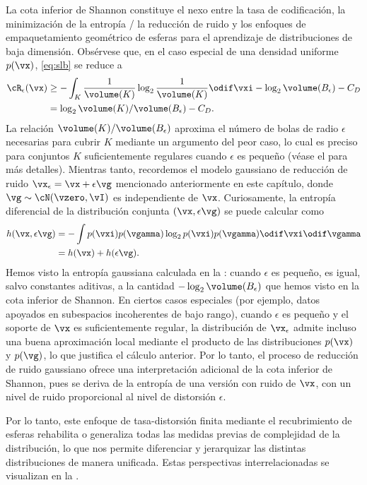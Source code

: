 \documentclass[../../book-main.tex]{subfiles}
\begin{document}
\begin{remark}
    La cota inferior de Shannon constituye el nexo entre la tasa de codificación, la minimización de la entropía /
    la reducción de ruido y los enfoques de empaquetamiento geométrico de esferas para el aprendizaje
    de distribuciones de baja dimensión. Obsérvese que, en el caso especial de una densidad uniforme
    $p(\vx)$, \eqref{eq:slb} se reduce a
    \begin{align}
        \cR_{\epsilon}(\vx) &\geq -\int_K \frac{1}{\volume(K)} \log_2
        \frac{1}{\volume(K)} \odif \vxi
        - \log_2 \volume(B_{\epsilon}) - C_D
        \\
        &=
        \log_2 \volume(K) / \volume(B_{\epsilon})
        - C_D. \label{eq:shannon-lower-bound-uniform}
    \end{align}
    La relación $\volume(K) / \volume(B_{\epsilon})$ aproxima el número de
    bolas de radio $\epsilon$ necesarias para cubrir $K$ mediante un argumento del peor caso, lo cual es
    preciso para conjuntos $K$ suficientemente regulares cuando $\epsilon$ es pequeño (véase
    el  para más detalles).
    Mientras tanto, recordemos el modelo gaussiano de reducción de ruido $\vx_{\epsilon} = \vx
    + \epsilon \vg$ mencionado
    anteriormente en este capítulo, donde $\vg \sim \cN(\vzero, \vI)$ es independiente de
    $\vx$.
    Curiosamente, la entropía diferencial de la distribución conjunta $(\vx,
    \epsilon\vg)$
    se puede calcular como
    \begin{align}
        h(\vx, \epsilon\vg)
        &=
        -\int
        p(\vxi) p(\vgamma) \log_2 p(\vxi) p(\vgamma) \odif \vxi \odif \vgamma
        \\
        &=
        h(\vx) + h(\epsilon \vg).
    \end{align}
    Hemos visto la entropía gaussiana calculada en la
    : cuando $\epsilon$ es pequeño, es igual, salvo
    constantes aditivas, a la cantidad $-\log_2
    \volume(B_{\epsilon})$ que hemos visto en la cota inferior de Shannon.
    En ciertos casos especiales (por ejemplo, datos apoyados en subespacios incoherentes
    de bajo rango),
    cuando $\epsilon$ es pequeño y el soporte de $\vx$ es suficientemente regular,
    la distribución de $\vx_{\epsilon}$ admite incluso una buena aproximación local
    mediante el
    producto de las distribuciones $p(\vx)$ y $p(\vg)$, lo que justifica el cálculo anterior.
    Por lo tanto, el proceso de reducción de ruido gaussiano ofrece una interpretación adicional de la
    cota inferior de Shannon, pues se deriva de la entropía de una versión con ruido de
    $\vx$, con un nivel de ruido proporcional al nivel de distorsión $\epsilon$.

    Por lo tanto, este enfoque de tasa-distorsión finita mediante el recubrimiento de esferas rehabilita o
    generaliza todas las medidas previas de complejidad de la
    distribución, lo que nos permite
    diferenciar y jerarquizar las distintas distribuciones de manera unificada.
    Estas perspectivas interrelacionadas se visualizan en la .
\end{remark}
\end{document}
